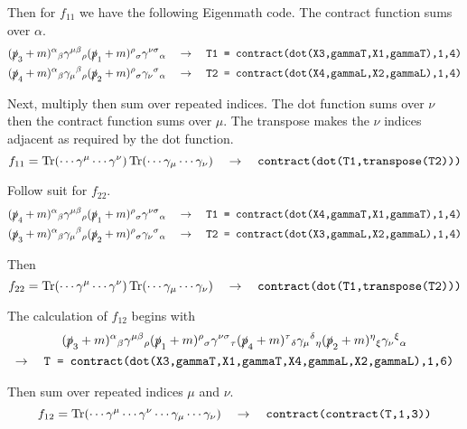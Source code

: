\documentclass[12pt]{article}
\begin{document}
Then for $f_{11}$ we have the following Eigenmath code.
The contract function sums over $\alpha$.
\begin{align*}
(\slashed{p}_3+m)^\alpha{}_\beta
\gamma^{\mu\beta}{}_\rho
(\slashed{p}_1+m)^\rho{}_\sigma
\gamma^{\nu\sigma}{}_\alpha
\quad&\rightarrow\quad
\text{\tt T1 = contract(dot(X3,gammaT,X1,gammaT),1,4)}
\\
(\slashed{p}_4+m)^\alpha{}_\beta
\gamma_\mu{}^\beta{}_\rho
(\slashed{p}_2+m)^\rho{}_\sigma
\gamma_\nu{}^\sigma{}_\alpha
\quad&\rightarrow\quad
\text{\tt T2 = contract(dot(X4,gammaL,X2,gammaL),1,4)}
\end{align*}

Next, multiply then sum over repeated indices.
The dot function sums over $\nu$ then the contract function
sums over $\mu$. The transpose makes the $\nu$ indices adjacent
as required by the dot function.
$$
f_{11}=
\mathop{\rm Tr}(\cdots\gamma^\mu\cdots\gamma^\nu)
\mathop{\rm Tr}(\cdots\gamma_\mu\cdots\gamma_\nu)
\quad\rightarrow\quad
\text{\tt contract(dot(T1,transpose(T2)))}
$$

Follow suit for $f_{22}$.
\begin{align*}
(\slashed{p}_4+m)^\alpha{}_\beta
\gamma^{\mu\beta}{}_\rho
(\slashed{p}_1+m)^\rho{}_\sigma
\gamma^{\nu\sigma}{}_\alpha
\quad&\rightarrow\quad
\text{\tt T1 = contract(dot(X4,gammaT,X1,gammaT),1,4)}
\\
(\slashed{p}_3+m)^\alpha{}_\beta
\gamma_\mu{}^\beta{}_\rho
(\slashed{p}_2+m)^\rho{}_\sigma
\gamma_\nu{}^\sigma{}_\alpha
\quad&\rightarrow\quad
\text{\tt T2 = contract(dot(X3,gammaL,X2,gammaL),1,4)}
\end{align*}

Then
$$
f_{22}=
\mathop{\rm Tr}(\cdots\gamma^\mu\cdots\gamma^\nu)
\mathop{\rm Tr}(\cdots\gamma_\mu\cdots\gamma_\nu)
\quad\rightarrow\quad
\text{\tt contract(dot(T1,transpose(T2)))}
$$

The calculation of $f_{12}$ begins with
\begin{multline*}
(\slashed{p}_3+m)^\alpha{}_\beta
\gamma^{\mu\beta}{}_\rho
(\slashed{p}_1+m)^\rho{}_\sigma
\gamma^{\nu\sigma}{}_\tau
(\slashed{p}_4+m)^\tau{}_\delta
\gamma_\mu{}^\delta{}_\eta
(\slashed{p}_2+m)^\eta{}_\xi
\gamma_\nu{}^\xi{}_\alpha
\\
\rightarrow\quad
\text{\tt T = contract(dot(X3,gammaT,X1,gammaT,X4,gammaL,X2,gammaL),1,6)}
\end{multline*}

Then sum over repeated indices $\mu$ and $\nu$.
$$
f_{12}=\mathop{\rm Tr}(\cdots\gamma^\mu\cdots\gamma^\nu\cdots\gamma_\mu\cdots\gamma_\nu)
\quad\rightarrow\quad
\text{\tt contract(contract(T,1,3))}
$$
\end{document}
